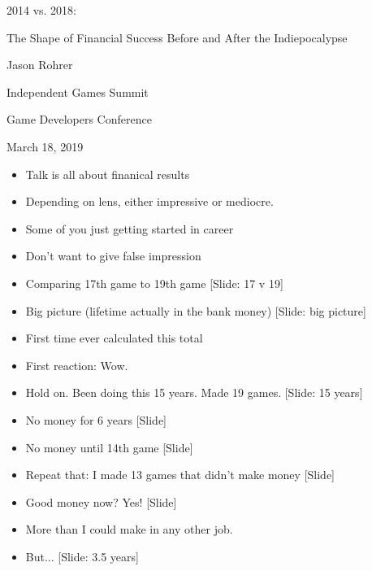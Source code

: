 \documentclass[12pt]{article}
\begin{document}
\begin{center}
2014 vs. 2018:

The Shape of Financial Success Before and After the Indiepocalypse

Jason Rohrer

Independent Games Summit

Game Developers Conference 

March 18, 2019
\end{center}


{\Huge



\begin{itemize}

\item Talk is all about finanical results

\item Depending on lens, either impressive or mediocre.

\item Some of you just getting started in career

\item Don't want to give false impression

\item Comparing 17th game to 19th game [Slide:  17 v 19]

\item Big picture (lifetime actually in the bank money) [Slide: big picture]

\item First time ever calculated this total

\item First reaction:  Wow.

\item Hold on.  Been doing this 15 years.  Made 19 games.  [Slide: 15 years]

\item No money for 6 years [Slide]

\item No money until 14th game [Slide]

\item Repeat that:  I made 13 games that didn't make money [Slide]

\item Good money now?  Yes!  [Slide]

\item More than I could make in any other job.

\item But... [Slide: 3.5 years]


\end{itemize}}
\end{document}
